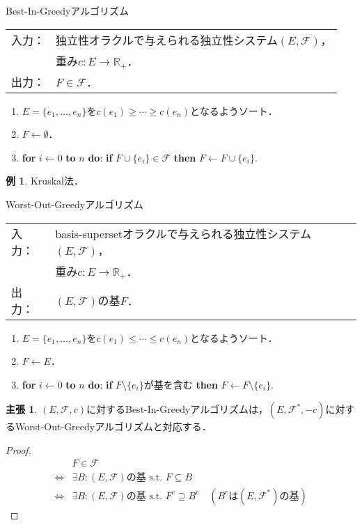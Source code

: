 \documentclass[xelatex,ja=standard,a4paper,14pt,everyparhook=compat]{bxjsarticle}
\newcommand{\bbR}{\mathbb{R}}
\newcommand{\mcF}{\mathcal{F}}
\theoremstyle{definition}
\newtheorem*{example*}{例}
\newtheorem*{claim}{主張}
\begin{document}
\newpage

\begin{itembox}[l]{Best-In-Greedyアルゴリズム}
    \begin{tabular}{ll}
        入力： & 独立性オラクルで与えられる独立性システム$(E, \mcF)$， \\
               & 重み$c : E \to \bbR_+$．                              \\
        出力： & $F \in \mcF$．
    \end{tabular}
\end{itembox}

\begin{enumerate}[label=\arabic*.]
    \item $E=\{e_1,\ldots,e_n\}$を$c(e_1) \geq \cdots \geq c(e_n)$となるようソート．
    \item $F \gets \emptyset$．
    \item \textbf{for} $i \gets 0$ \textbf{to} $n$ \textbf{do}: \textbf{if} $F \cup \{e_i\} \in \mcF$ \textbf{then} $F \gets F \cup \{e_i\}$.
\end{enumerate}

\begin{example*}
    Kruskal法．
\end{example*}

\begin{itembox}[l]{Worst-Out-Greedyアルゴリズム}
    \begin{tabular}{ll}
        入力： & basis-supersetオラクルで与えられる独立性システム$(E, \mcF)$， \\
               & 重み$c : E \to \bbR_+$．                              \\
        出力： & $(E, \mcF)$の基$F$．
    \end{tabular}
\end{itembox}

\begin{enumerate}[label=\arabic*.]
    \item $E=\{e_1,\ldots,e_n\}$を$c(e_1) \leq \cdots \leq c(e_n)$となるようソート．
    \item $F \gets E$．
    \item \textbf{for} $i \gets 0$ \textbf{to} $n$ \textbf{do}: \textbf{if} $F \setminus \{e_i\}$が基を含む \textbf{then} $F \gets F \setminus \{e_i\}$.
\end{enumerate}

\begin{claim}
    $(E, \mcF, c)$に対するBest-In-Greedyアルゴリズムは，$(E, \mcF^*, -c)$に対するWorst-Out-Greedyアルゴリズムと対応する．
\end{claim}
\begin{proof}
    \begin{align*}
        &F \in \mcF \\
        \Longleftrightarrow{}& \text{$\exists B:\text{$(E,\mcF)$の基}$ s.t. $F \subseteq B$} \\
        \Longleftrightarrow{}& \text{$\exists B:\text{$(E,\mcF)$の基}$ s.t. $F^c \supseteq B^c$} \quad (\text{$B^c$は$(E,\mcF^*)$の基})
    \end{align*}
\end{proof}
\end{document}
